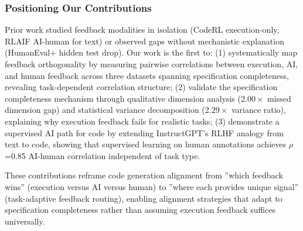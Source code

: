 \subsubsection{Positioning Our Contributions}

Prior work studied feedback modalities in isolation (CodeRL execution-only, RLAIF AI-human for text) or observed gaps without mechanistic explanation (HumanEval+ hidden test drop). Our work is the first to: (1) systematically map feedback orthogonality by measuring pairwise correlations between execution, AI, and human feedback across three datasets spanning specification completeness, revealing task-dependent correlation structure; (2) validate the specification completeness mechanism through qualitative dimension analysis (2.$00\times$ missed dimension gap) and statistical variance decomposition (2.$29\times$ variance ratio), explaining why execution feedback fails for realistic tasks; (3) demonstrate a supervised AI path for code by extending InstructGPT's RLHF analogy from text to code, showing that supervised learning on human annotations achieves $\rho$=0.85 AI-human correlation independent of task type.

These contributions reframe code generation alignment from ''which feedback wins'' (execution versus AI versus human) to ''where each provides unique signal'' (task-adaptive feedback routing), enabling alignment strategies that adapt to specification completeness rather than assuming execution feedback suffices universally.
